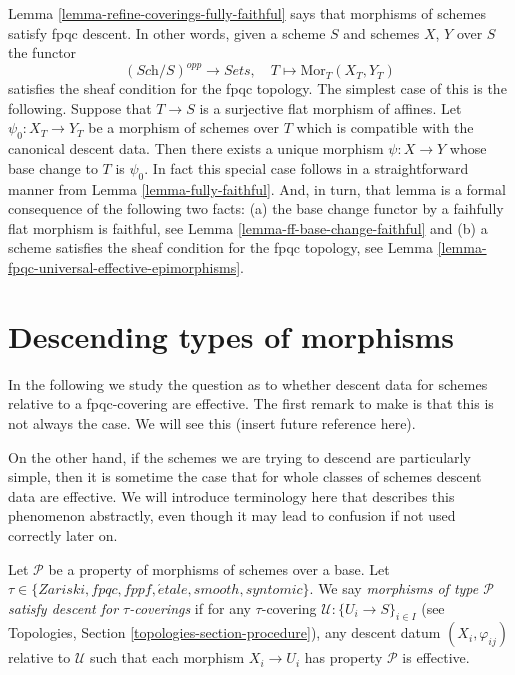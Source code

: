 \begin{remark}
\label{remark-morphisms-of-schemes-satisfy-fpqc-descent}
Lemma \ref{lemma-refine-coverings-fully-faithful}
says that morphisms of schemes satisfy fpqc descent.
In other words, given a scheme $S$ and schemes $X$, $Y$ over $S$
the functor
$$
(\textit{Sch}/S)^{opp} \longrightarrow \textit{Sets},
\quad
T \longmapsto \text{Mor}_T(X_T, Y_T)
$$
satisfies the sheaf condition for the fpqc topology.
The simplest case of this is the following. Suppose that $T \to S$
is a surjective flat morphism of affines. Let $\psi_0 : X_T \to Y_T$
be a morphism of schemes over $T$ which is compatible with the
canonical descent data. Then there exists a unique morphism
$\psi : X \to Y$ whose base change to $T$ is $\psi_0$. In fact this
special case follows in a straightforward manner from
Lemma \ref{lemma-fully-faithful}.
And, in turn, that lemma is a formal consequence of the following
two facts:
(a) the base change functor by a faihfully flat morphism is faithful, see
Lemma \ref{lemma-ff-base-change-faithful}
and (b) a scheme satisfies the sheaf condition for the fpqc topology, see
Lemma \ref{lemma-fpqc-universal-effective-epimorphisms}.
\end{remark}







\section{Descending types of morphisms}
\label{section-descending-types-morphisms}

\noindent
In the following we study the question as to whether
descent data for schemes relative to a fpqc-covering
are effective. The first remark to make is that this
is not always the case. We will see this (insert
future reference here).

\medskip\noindent
On the other hand, if the schemes we are trying to
descend are particularly simple, then it is sometime the
case that for whole classes of schemes descent data
are effective. We will introduce terminology here that
describes this phenomenon abstractly, even though it
may lead to confusion if not used correctly later on.

\begin{definition}
\label{definition-descending-types-morphisms}
Let $\mathcal{P}$ be a property of morphisms of schemes over a base.
Let $\tau \in \{Zariski, fpqc, fppf, \acute{e}tale, smooth, syntomic\}$.
We say
{\it morphisms of type $\mathcal{P}$ satisfy descent for $\tau$-coverings}
if for
any $\tau$-covering $\mathcal{U} : \{U_i \to S\}_{i \in I}$
(see Topologies, Section \ref{topologies-section-procedure}),
any descent datum $(X_i, \varphi_{ij})$ relative to $\mathcal{U}$
such that each morphism $X_i \to U_i$ has property $\mathcal{P}$
is effective.
\end{definition}

